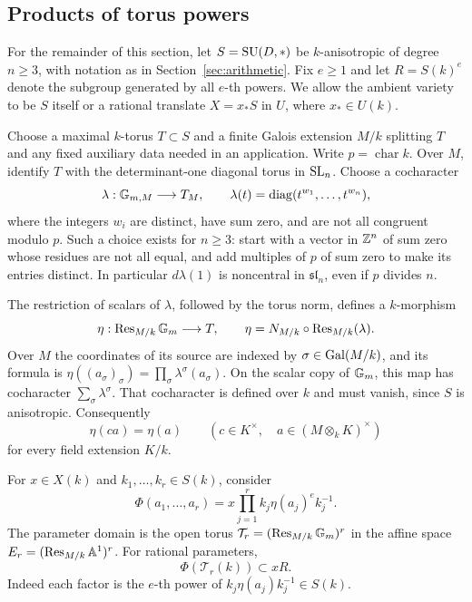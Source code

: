 \subsection{Products of torus powers}

For the remainder of this section, let $S=\operatorname{SU}(D,*)$ be
$k$-anisotropic of degree $n\geq3$, with notation as in
Section~\ref{sec:arithmetic}.  Fix $e\geq1$ and let
$R=S(k)^e$ denote the subgroup generated by all $e$-th powers.
We allow the ambient variety to be $S$ itself or a rational
translate $X=x_*S$ in $U$, where $x_*\in U(k)$.

Choose a maximal $k$-torus $T\subset S$ and a finite Galois
extension $M/k$ splitting $T$ and any fixed auxiliary data needed
in an application.  Write $p=\operatorname{char}k$.
Over $M$, identify $T$ with the determinant-one diagonal torus
in $\operatorname{SL}_n$.  Choose a cocharacter
\[
 \lambda:\mathbb G_{m,M}\longrightarrow T_M,
 \qquad
 \lambda(t)=\operatorname{diag}(t^{w_1},\ldots,t^{w_n}),
\]
where the integers $w_i$ are distinct, have sum zero, and are
not all congruent modulo $p$.  Such a choice exists for $n\geq3$:
start with a vector in $\mathbb Z^n$ of sum zero whose residues are
not all equal, and add multiples of $p$ of sum zero to make
its entries distinct.  In particular $d\lambda(1)$ is noncentral
in $\mathfrak{sl}_n$, even if $p$ divides $n$.

The restriction of scalars of $\lambda$, followed by the torus
norm, defines a $k$-morphism
\begin{equation}\label{approx:eta}
 \eta:\operatorname{Res}_{M/k}\mathbb G_m\longrightarrow T,
 \qquad
 \eta=N_{M/k}\circ\operatorname{Res}_{M/k}(\lambda).
\end{equation}
Over $M$ the coordinates of its source are indexed by
$\sigma\in\operatorname{Gal}(M/k)$, and its formula is
$\eta((a_\sigma)_\sigma)=\prod_\sigma
\lambda^\sigma(a_\sigma)$.
On the scalar copy of $\mathbb G_m$, this map has cocharacter
$\sum_\sigma\lambda^\sigma$.  That cocharacter is defined over
$k$ and must vanish, since $S$ is anisotropic.  Consequently
\begin{equation}\label{approx:scalar-invariance}
 \eta(ca)=\eta(a)
 \qquad(c\in K^\times,\quad a\in(M\otimes_k K)^\times)
\end{equation}
for every field extension $K/k$.

For $x\in X(k)$ and $k_1,\ldots,k_r\in S(k)$, consider
\begin{equation}\label{approx:product}
 \Phi(a_1,\ldots,a_r)
   =x\prod_{j=1}^r k_j\eta(a_j)^e k_j^{-1}.
\end{equation}
The parameter domain is the open torus
$\mathcal T_r=(\operatorname{Res}_{M/k}\mathbb G_m)^r$ in the affine space
$E_r=(\operatorname{Res}_{M/k}\mathbb A^1)^r$.  For rational parameters,
\begin{equation}\label{approx:exact-coset}
                    \Phi(\mathcal T_r(k))\subset xR.
\end{equation}
Indeed each factor is the $e$-th power of
$k_j\eta(a_j)k_j^{-1}\in S(k)$.

